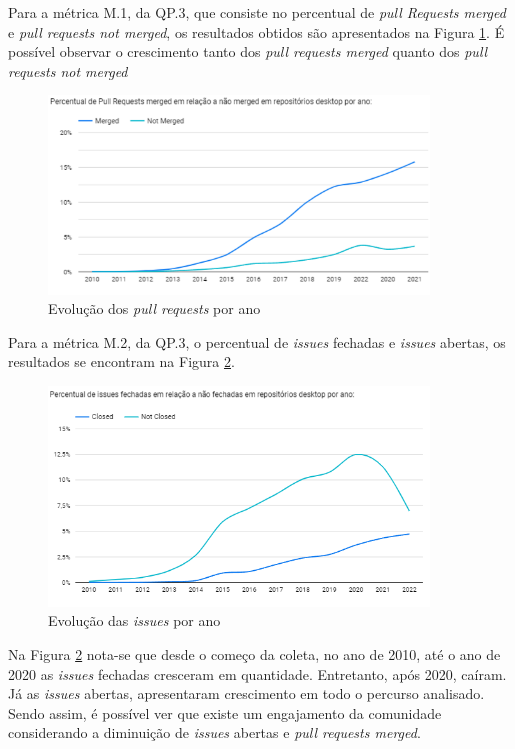 \documentclass[12pt]{article}
\begin{document}
Para a métrica M.1, da QP.3, que consiste no percentual de \emph{pull Requests merged} e \emph{pull requests not merged}, os resultados obtidos são apresentados na Figura \ref{fig:Evolução dos Pull Requests por ano}. É possível observar o crescimento tanto dos \emph{pull requests merged} quanto dos  \emph{pull requests not merged}
\begin{figure}[H]
    \centering
    \includegraphics[width=0.9\textwidth]{images/percentual por ano PR.png}
    \caption{Evolução dos \emph{pull requests} por ano}
    \label{fig:Evolução dos Pull Requests por ano}
\end{figure}

Para a métrica M.2, da QP.3, o percentual de \emph{issues} fechadas e  \emph{issues} abertas, os resultados se encontram na Figura \ref{fig:Evolução das Issues por ano}.
\begin{figure}[H]
    \centering
    \includegraphics[width=0.9\textwidth]{images/issues por ano.png}
    \caption{Evolução das \emph{issues} por ano}
    \label{fig:Evolução das Issues por ano}
\end{figure}
Na Figura \ref{fig:Evolução das Issues por ano} nota-se que desde o começo da coleta, no ano de 2010, até o ano de 2020 as \emph{issues} fechadas cresceram em quantidade. Entretanto, após 2020, caíram. Já as \emph{issues} abertas, apresentaram crescimento em todo o percurso analisado. Sendo assim, é possível ver que existe um engajamento da comunidade considerando a diminuição de \emph{issues} abertas e \emph{pull requests merged}.



\end{document}
